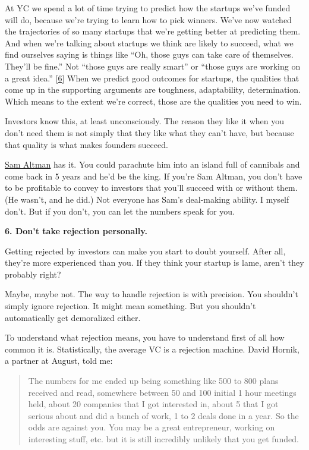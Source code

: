 At YC we spend a lot of time trying to predict how the startups we've
funded will do, because we're trying to learn how to pick winners. We've
now watched the trajectories of so many startups that we're getting
better at predicting them. And when we're talking about startups we
think are likely to succeed, what we find ourselves saying is things
like ``Oh, those guys can take care of themselves. They'll be fine.''
Not ``those guys are really smart'' or ``those guys are working on a
great idea.'' {[}\hyperref[f6n]{6}{]} When we predict good outcomes for
startups, the qualities that come up in the supporting arguments are
toughness, adaptability, determination. Which means to the extent we're
correct, those are the qualities you need to win.

Investors know this, at least unconsciously. The reason they like it
when you don't need them is not simply that they like what they can't
have, but because that quality is what makes founders succeed.

\href{http://www.youtube.com/watch?v=KhhId_WG7RA}{Sam Altman} has it.
You could parachute him into an island full of cannibals and come back
in 5 years and he'd be the king. If you're Sam Altman, you don't have to
be profitable to convey to investors that you'll succeed with or without
them. (He wasn't, and he did.) Not everyone has Sam's deal-making
ability. I myself don't. But if you don't, you can let the numbers speak
for you.

\textbf{6. Don't take rejection personally.}

Getting rejected by investors can make you start to doubt yourself.
After all, they're more experienced than you. If they think your startup
is lame, aren't they probably right?

Maybe, maybe not. The way to handle rejection is with precision. You
shouldn't simply ignore rejection. It might mean something. But you
shouldn't automatically get demoralized either.

To understand what rejection means, you have to understand first of all
how common it is. Statistically, the average VC is a rejection machine.
David Hornik, a partner at August, told me:

\begin{quote}
The numbers for me ended up being something like 500 to 800 plans
received and read, somewhere between 50 and 100 initial 1 hour meetings
held, about 20 companies that I got interested in, about 5 that I got
serious about and did a bunch of work, 1 to 2 deals done in a year. So
the odds are against you. You may be a great entrepreneur, working on
interesting stuff, etc. but it is still incredibly unlikely that you get
funded.
\end{quote}


